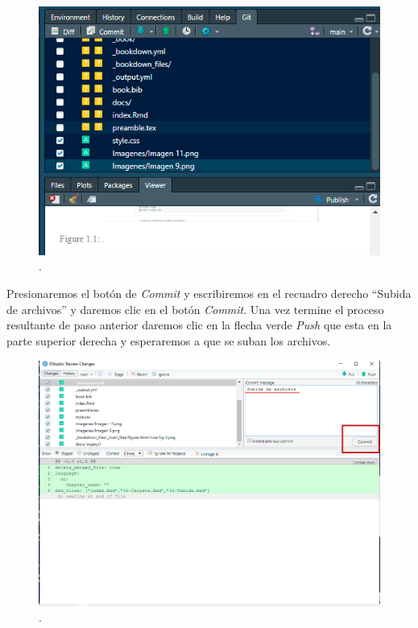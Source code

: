 \documentclass[
  11pt,
  spanish,
  oneside]{book}
\begin{document}
\begin{figure}

{\centering \includegraphics[width=0.7\linewidth]{imagenes/Imagen 10} 

}

\caption{.}\label{fig:unnamed-chunk-11}
\end{figure}

Presionaremos el botón de \emph{Commit} y escribiremos en el recuadro derecho ``Subida de archivos'' y daremos clic en el botón \emph{Commit}. Una vez termine el proceso resultante de paso anterior daremos clic en la flecha verde \emph{Push} que esta en la parte superior derecha y esperaremos a que se suban los archivos.

\begin{figure}

{\centering \includegraphics[width=0.7\linewidth]{imagenes/Imagen 12} 

}

\caption{.}\label{fig:unnamed-chunk-12}
\end{figure}
\end{document}
